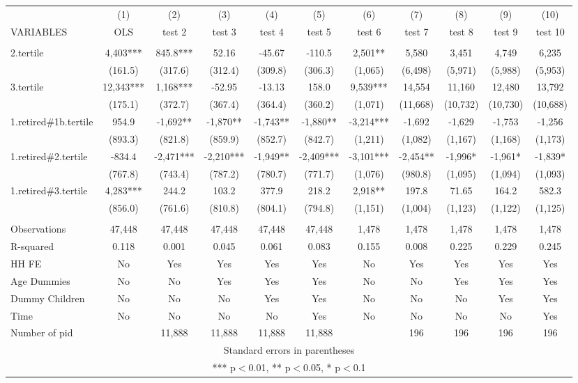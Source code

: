 \begin{tabular}{lcccccccccc} \hline
 & (1) & (2) & (3) & (4) & (5) & (6) & (7) & (8) & (9) & (10) \\
VARIABLES & OLS & test 2 & test 3 & test 4 & test 5 & test 6 & test 7 & test 8 & test 9 & test 10 \\ \hline
 &  &  &  &  &  &  &  &  &  &  \\
2.tertile & 4,403*** & 845.8*** & 52.16 & -45.67 & -110.5 & 2,501** & 5,580 & 3,451 & 4,749 & 6,235 \\
 & (161.5) & (317.6) & (312.4) & (309.8) & (306.3) & (1,065) & (6,498) & (5,971) & (5,988) & (5,953) \\
3.tertile & 12,343*** & 1,168*** & -52.95 & -13.13 & 158.0 & 9,539*** & 14,554 & 11,160 & 12,480 & 13,792 \\
 & (175.1) & (372.7) & (367.4) & (364.4) & (360.2) & (1,071) & (11,668) & (10,732) & (10,730) & (10,688) \\
1.retired\#1b.tertile & 954.9 & -1,692** & -1,870** & -1,743** & -1,880** & -3,214*** & -1,692 & -1,629 & -1,753 & -1,256 \\
 & (893.3) & (821.8) & (859.9) & (852.7) & (842.7) & (1,211) & (1,082) & (1,167) & (1,168) & (1,173) \\
1.retired\#2.tertile & -834.4 & -2,471*** & -2,210*** & -1,949** & -2,409*** & -3,101*** & -2,454** & -1,996* & -1,961* & -1,839* \\
 & (767.8) & (743.4) & (787.2) & (780.7) & (771.7) & (1,076) & (980.8) & (1,095) & (1,094) & (1,093) \\
1.retired\#3.tertile & 4,283*** & 244.2 & 103.2 & 377.9 & 218.2 & 2,918** & 197.8 & 71.65 & 164.2 & 582.3 \\
 & (856.0) & (761.6) & (810.8) & (804.1) & (794.8) & (1,151) & (1,004) & (1,123) & (1,122) & (1,125) \\
 &  &  &  &  &  &  &  &  &  &  \\
Observations & 47,448 & 47,448 & 47,448 & 47,448 & 47,448 & 1,478 & 1,478 & 1,478 & 1,478 & 1,478 \\
R-squared & 0.118 & 0.001 & 0.045 & 0.061 & 0.083 & 0.155 & 0.008 & 0.225 & 0.229 & 0.245 \\
HH FE & No & Yes & Yes & Yes & Yes & No & Yes & Yes & Yes & Yes \\
Age Dummies & No & No & Yes & Yes & Yes & No & No & Yes & Yes & Yes \\
Dummy Children & No & No & No & Yes & Yes & No & No & No & Yes & Yes \\
Time & No & No & No & No & Yes & No & No & No & No & Yes \\
 Number of pid &  & 11,888 & 11,888 & 11,888 & 11,888 &  & 196 & 196 & 196 & 196 \\ \hline
\multicolumn{11}{c}{ Standard errors in parentheses} \\
\multicolumn{11}{c}{ *** p$<$0.01, ** p$<$0.05, * p$<$0.1} \\
\end{tabular}
